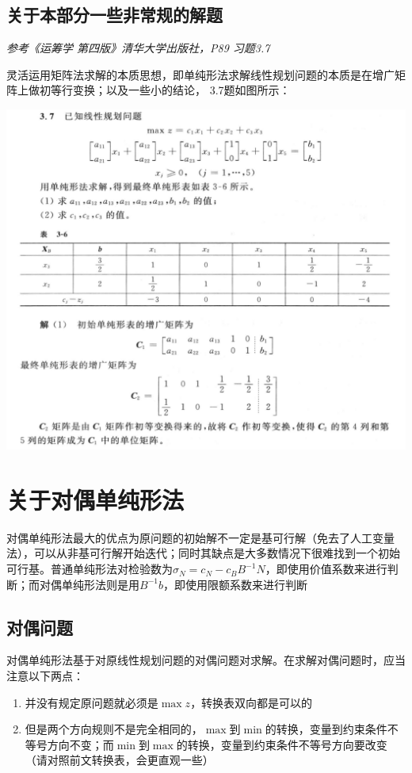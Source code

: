 \documentclass[]{report}
\begin{document}
		\subsection{关于本部分一些非常规的解题}
		\textit{参考《运筹学 第四版》清华大学出版社，P89 习题3.7}\par
		灵活运用矩阵法求解的本质思想，即单纯形法求解线性规划问题的本质是在增广矩阵上做初等行变换；以及一些小的结论，
		3.7题如图所示：\par
		\includegraphics[scale = 0.37]{pictures/Exe_3.7.png}\par
	\section{关于对偶单纯形法}
		对偶单纯形法最大的优点为原问题的初始解不一定是基可行解（免去了人工变量法），可以从非基可行解开始迭代；同时其缺点是大多数情况下很难找到一个初始可行基。普通单纯形法对检验数为$\sigma_N=c_N-c_BB^{-1}N$，即使用价值系数来进行判断；而对偶单纯形法则是用$B^{-1}b$，即使用限额系数来进行判断
		\subsection{对偶问题}
		对偶单纯形法基于对原线性规划问题的对偶问题对求解。在求解对偶问题时，应当注意以下两点：
		\begin{enumerate}
			\item 并没有规定原问题就必须是$\max z$，转换表双向都是可以的
			\item 但是两个方向规则不是完全相同的，$\max$到$\min$的转换，变量到约束条件不等号方向不变；而$\min$到$\max$的转换，变量到约束条件不等号方向要改变（请对照前文转换表，会更直观一些）
		\end{enumerate}
\end{document}
